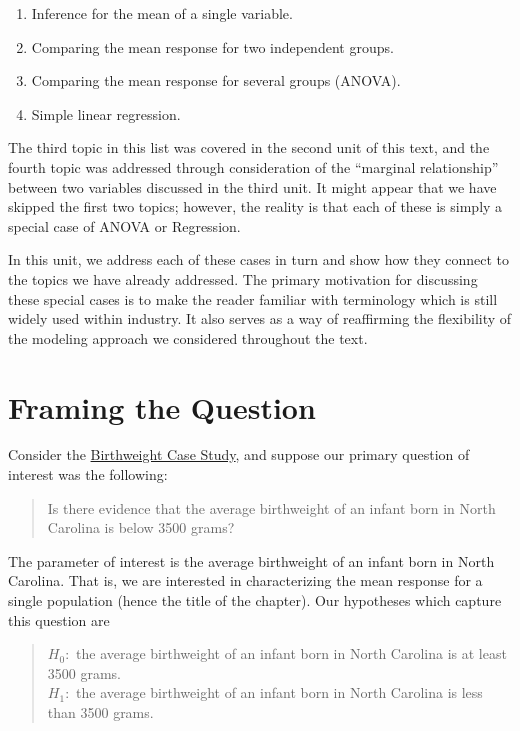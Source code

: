 \documentclass[]{book}
\providecommand{\tightlist}{%
  \setlength{\itemsep}{0pt}\setlength{\parskip}{0pt}}
\theoremstyle{definition}
\theoremstyle{definition}
\theoremstyle{definition}
\theoremstyle{remark}
\begin{document}
\begin{enumerate}
\def\labelenumi{\arabic{enumi}.}
\tightlist
\item
  Inference for the mean of a single variable.
\item
  Comparing the mean response for two independent groups.
\item
  Comparing the mean response for several groups (ANOVA).
\item
  Simple linear regression.
\end{enumerate}

The third topic in this list was covered in the second unit of this
text, and the fourth topic was addressed through consideration of the
``marginal relationship'' between two variables discussed in the third
unit. It might appear that we have skipped the first two topics;
however, the reality is that each of these is simply a special case of
ANOVA or Regression.

In this unit, we address each of these cases in turn and show how they
connect to the topics we have already addressed. The primary motivation
for discussing these special cases is to make the reader familiar with
terminology which is still widely used within industry. It also serves
as a way of reaffirming the flexibility of the modeling approach we
considered throughout the text.

\section{Framing the Question}\label{framing-the-question-1}

Consider the \protect\hyperlink{CaseBabies}{Birthweight Case Study}, and
suppose our primary question of interest was the following:

\begin{quote}
Is there evidence that the average birthweight of an infant born in
North Carolina is below 3500 grams?
\end{quote}

The parameter of interest is the average birthweight of an infant born
in North Carolina. That is, we are interested in characterizing the mean
response for a single population (hence the title of the chapter). Our
hypotheses which capture this question are

\begin{quote}
\(H_0:\) the average birthweight of an infant born in North Carolina is
at least 3500 grams.\\
\(H_1:\) the average birthweight of an infant born in North Carolina is
less than 3500 grams.
\end{quote}
\end{document}
